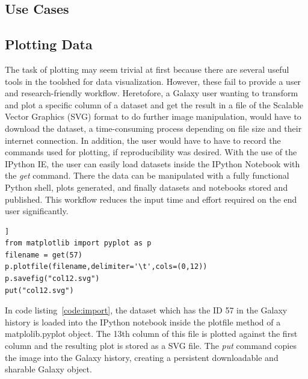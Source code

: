 \documentclass{bioinfo}
\begin{document}
\begin{methods}
\section{Use Cases}
\subsection{Plotting Data}
The task of plotting may seem trivial at first because there are several useful tools in the toolshed for data visualization.
However, these fail to provide a user and research-friendly workflow.
Heretofore, a Galaxy user wanting to transform and plot a specific column of a dataset and
get the result in a file of the Scalable Vector Graphics (SVG) format to do further image manipulation,
would have to download the dataset, a time-consuming process depending on file size and their internet
connection. In addition, the user would have to have to record the commands used for plotting, if reproducibility was desired.
With the use of the IPython IE, the user can easily load datasets inside the IPython Notebook with the \textit{get} command. There the data can be manipulated 
with a fully functional Python shell, plots generated, and finally datasets and notebooks stored and published.
This workflow reduces the input time and effort required on the end user significantly.

\begin{lstlisting}[frame=single,caption={Use Case Example},label=code:import]]
from matplotlib import pyplot as p
filename = get(57)
p.plotfile(filename,delimiter='\t',cols=(0,12))
p.savefig("col12.svg")
put("col12.svg")
\end{lstlisting}
In code listing~\ref{code:import}, the dataset which has the ID 57 in the Galaxy history is loaded into the IPython notebook inside the
plotfile method of a matplolib.pyplot object. The 13th column of this file is plotted against the first column and the
resulting plot is stored as a SVG file. The \textit{put} command copies the image into the Galaxy history, creating a persistent
downloadable and sharable Galaxy object.



\end{methods}
\end{document}
